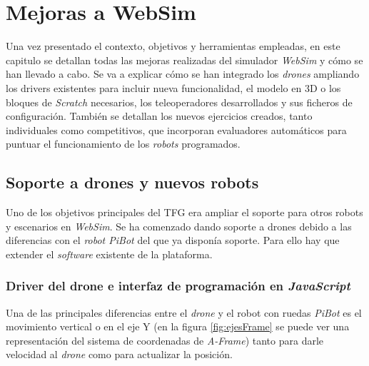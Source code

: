 \chapter{Mejoras a WebSim}
\label{chap:mejoras}
Una vez presentado el contexto, objetivos y herramientas empleadas, en este capitulo se detallan todas las mejoras realizadas del simulador \textit{WebSim} y cómo se han llevado a cabo. Se va a explicar cómo se han integrado los \textit{drones} ampliando los drivers existentes para incluir nueva funcionalidad, el modelo en 3D o los bloques de \textit{Scratch} necesarios, los teleoperadores desarrollados y sus ficheros de configuración. También se detallan los nuevos ejercicios creados, tanto individuales como competitivos, que incorporan evaluadores automáticos para puntuar el funcionamiento de los \textit{robots} programados.

\section{Soporte a drones y nuevos robots}
\label{sec:drone}

Uno de los objetivos principales del TFG era ampliar el soporte para otros robots y escenarios en \textit{WebSim}. Se ha comenzado dando soporte a drones debido a las diferencias con el \textit{robot PiBot} del que ya disponía soporte. 
Para ello hay que extender el \textit{software} existente de la plataforma.
\subsection{Driver del drone e interfaz de programación en \textit{JavaScript}}

Una de las principales diferencias entre el \textit{drone} y el robot con ruedas \textit{PiBot} es el movimiento vertical o en el eje Y (en la figura \ref{fig:ejesFrame} se puede ver una representación del sistema de coordenadas de \textit{A-Frame}) tanto para darle velocidad al \textit{drone} como para actualizar la posición. 

